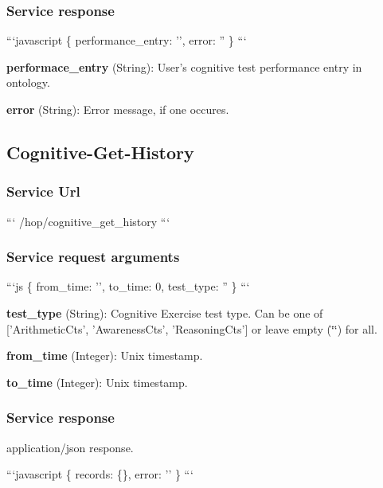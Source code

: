 \subsubsection*{Service response}

```javascript \{ performance\-\_\-entry\-: '', error\-: '' \} ```


\begin{DoxyItemize}
\item {\bfseries performace\-\_\-entry} (String)\-: User's cognitive test performance entry in ontology.
\item {\bfseries error} (String)\-: Error message, if one occures.
\end{DoxyItemize}

\subsection*{Cognitive-\/\-Get-\/\-History}

\subsubsection*{Service Url}

``` /hop/cognitive\-\_\-get\-\_\-history ```

\subsubsection*{Service request arguments}

```js \{ from\-\_\-time\-: '', to\-\_\-time\-: 0, test\-\_\-type\-: '' \} ```


\begin{DoxyItemize}
\item {\bfseries test\-\_\-type} (String)\-: Cognitive Exercise test type. Can be one of \mbox{[}'Arithmetic\-Cts', 'Awareness\-Cts', 'Reasoning\-Cts'\mbox{]} or leave empty (\char`\"{}\char`\"{}) for all.
\item {\bfseries from\-\_\-time} (Integer)\-: Unix timestamp.
\item {\bfseries to\-\_\-time} (Integer)\-: Unix timestamp.
\end{DoxyItemize}

\subsubsection*{Service response}

application/json response.

```javascript \{ records\-: \{\}, error\-: '' \} ```


